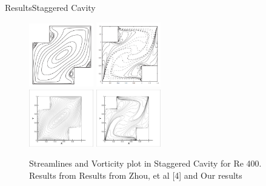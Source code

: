 \documentclass[11pt]{beamer}
\begin{document}
\begin{frame}{Results}{Staggered Cavity}
\begin{figure}
\includegraphics[width=0.25\textwidth]{images/stagerred/re400psiP}
\includegraphics[width=0.25\textwidth]{images/stagerred/re400omegaP}\\
\includegraphics[width=0.25\textwidth]{images/stagerred/repsi400}
\includegraphics[width=0.25\textwidth]{images/stagerred/re400omega}
\caption{Streamlines and Vorticity plot in Staggered Cavity for Re 400. Results from Results from Zhou, et al [4] and Our results}
\end{figure}
\end{frame}
\end{document}
